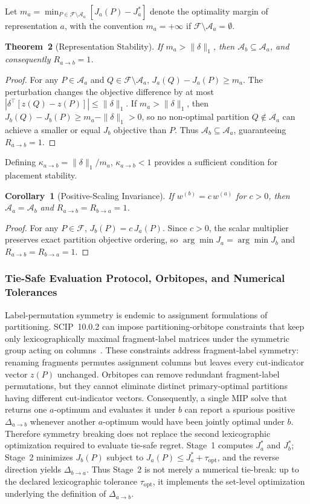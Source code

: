 \documentclass[11pt]{article}
\begin{document}
Let $m_a = \min_{P \in \mathcal{F} \setminus \mathcal{A}_a} [J_a(P) - J_a^*]$ denote the optimality margin of representation $a$, with the convention $m_a = +\infty$ if $\mathcal{F} \setminus \mathcal{A}_a = \emptyset$.

\textbf{Theorem~2} (Representation Stability). \textit{If $m_a > \|\delta\|_1$, then $\mathcal{A}_b \subseteq \mathcal{A}_a$, and consequently $R_{a\to b} = 1$.}

\begin{proof} For any $P \in \mathcal{A}_a$ and $Q \in \mathcal{F} \setminus \mathcal{A}_a$, $J_a(Q) - J_a(P) \ge m_a$. The perturbation changes the objective difference by at most $|\delta^\top [z(Q) - z(P)]| \le \|\delta\|_1$. If $m_a > \|\delta\|_1$, then $J_b(Q) - J_b(P) \ge m_a - \|\delta\|_1 > 0$, so no non-optimal partition $Q \notin \mathcal{A}_a$ can achieve a smaller or equal $J_b$ objective than $P$. Thus $\mathcal{A}_b \subseteq \mathcal{A}_a$, guaranteeing $R_{a\to b} = 1$.\end{proof}

Defining $\kappa_{a\to b} = \|\delta\|_1 / m_a$, $\kappa_{a\to b} < 1$ provides a sufficient condition for placement stability.

\textbf{Corollary~1} (Positive-Scaling Invariance). \textit{If $w^{(b)} = c \, w^{(a)}$ for $c > 0$, then $\mathcal{A}_a = \mathcal{A}_b$ and $R_{a\to b} = R_{b\to a} = 1$.}

\begin{proof} For any $P\in\mathcal{F}$, $J_b(P) = c \, J_a(P)$. Since $c > 0$, the scalar multiplier preserves exact partition objective ordering, so $\arg\min J_a = \arg\min J_b$ and $R_{a\to b} = R_{b\to a} = 1$.\end{proof}

\subsubsection{Tie-Safe Evaluation Protocol, Orbitopes, and Numerical Tolerances}
Label-permutation symmetry is endemic to assignment formulations of partitioning. SCIP~10.0.2 can impose partitioning-orbitope constraints that keep only lexicographically maximal fragment-label matrices under the symmetric group acting on columns~\cite{kaibel2008}. These constraints address fragment-label symmetry: renaming fragments permutes assignment columns but leaves every cut-indicator vector $z(P)$ unchanged. Orbitopes can remove redundant fragment-label permutations, but they cannot eliminate distinct primary-optimal partitions having different cut-indicator vectors. Consequently, a single MIP solve that returns one $a$-optimum and evaluates it under $b$ can report a spurious positive $\Delta_{a\to b}$ whenever another $a$-optimum would have been jointly optimal under $b$. Therefore symmetry breaking does not replace the second lexicographic optimization required to evaluate tie-safe regret. Stage~1 computes $J_a^*$ and $J_b^*$; Stage~2 minimizes $J_b(P)$ subject to $J_a(P)\le J_a^*+\tau_{\mathrm{opt}}$, and the reverse direction yields $\Delta_{b\to a}$. Thus Stage~2 is not merely a numerical tie-break: up to the declared lexicographic tolerance $\tau_{\mathrm{opt}}$, it implements the set-level optimization underlying the definition of $\Delta_{a\to b}$.
\end{document}

